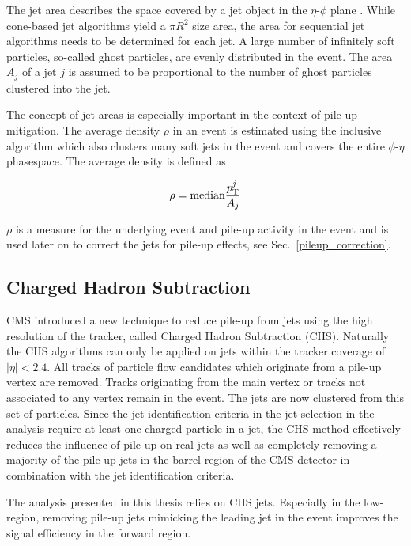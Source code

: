 The jet area describes the space covered by a jet object in the $\eta$-$\phi$
plane . While cone-based jet algorithms yield a $\pi R^2$ size area, the area
for sequential jet algorithms needs to be determined for each jet. A large
number of infinitely soft particles, so-called ghost particles, are evenly
distributed in the event. The area $A_j$ of a jet $j$ is assumed to be
proportional to the number of ghost particles clustered into the jet. 

The concept of jet areas is especially important in the context of pile-up
mitigation. The average \pt density $\rho$ in an event is estimated using the inclusive
\kt algorithm which also clusters many soft jets in the event and covers the
entire $\phi$-$\eta$ phasespace. The average \pt density is defined as

\begin{equation*}
    \rho = \text{median} \frac{p_{\mathrm{T}}^j}{A_j}
\end{equation*}

$\rho$ is a measure for the underlying event and pile-up activity in the event
and is used later on to correct the jets for pile-up effects, see
Sec.~\ref{pileup_correction}.

\subsection{Charged Hadron Subtraction}

CMS introduced a new technique to reduce pile-up from jets using the high
resolution of the tracker, called Charged Hadron Subtraction (CHS). Naturally
the CHS algorithms can only be applied on jets within the tracker coverage of
$|\eta| < 2.4$. All tracks of particle flow candidates which originate from a
pile-up vertex are removed. Tracks originating from the main vertex or tracks
not associated to any vertex remain in the event. The jets are now clustered
from this set of particles. Since the jet identification criteria in
the jet selection in the analysis require at least one charged particle in a
jet, the CHS method effectively reduces the influence of pile-up on real jets as
well as completely removing a majority of the pile-up jets in the barrel region of the CMS
detector in combination with the jet identification criteria.

The analysis presented in this thesis relies on CHS jets. Especially in the
low-\pt region, removing pile-up jets mimicking the leading jet in the event
improves the signal efficiency in the forward region.

